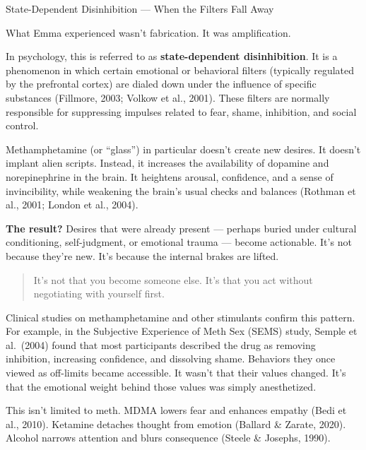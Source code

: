 \begin{TechnicalSidebar}{State-Dependent Disinhibition — When the Filters Fall Away}

  What Emma experienced wasn’t fabrication. It was amplification.

  \medskip
  
  In psychology, this is referred to as \textbf{state-dependent disinhibition}. It is a phenomenon 
  in which certain emotional or behavioral filters (typically regulated by the prefrontal cortex) 
  are dialed down under the influence of specific substances (Fillmore, 2003; Volkow et al., 2001). 
  These filters are normally responsible for suppressing impulses related to fear, shame, inhibition, 
  and social control.

  \medskip
  
  Methamphetamine (or “glass”) in particular doesn’t create new desires. It doesn’t implant alien 
  scripts. Instead, it increases the availability of dopamine and norepinephrine in the brain. It 
  heightens arousal, confidence, and a sense of invincibility, while weakening the brain’s usual 
  checks and balances (Rothman et al., 2001; London et al., 2004).

  \medskip
  
  \textbf{The result?}  
  Desires that were already present --- perhaps buried under cultural conditioning, self-judgment, 
  or emotional trauma --- become actionable. It's not because they’re new. It's because the internal 
  brakes are lifted.

  \begin{quote}
  It’s not that you become someone else.  
  It’s that you act without negotiating with yourself first.
  \end{quote}
  
  Clinical studies on methamphetamine and other stimulants confirm this pattern. For example, in 
  the Subjective Experience of Meth Sex (SEMS) study, Semple et al.\ (2004) found that most participants 
  described the drug as removing inhibition, increasing confidence, and dissolving shame. Behaviors they 
  once viewed as off-limits became accessible. It wasn’t that their values changed. It's that the emotional 
  weight behind those values was simply anesthetized.

  \medskip

  This isn’t limited to meth.  
  MDMA lowers fear and enhances empathy (Bedi et al., 2010).  
  Ketamine detaches thought from emotion (Ballard \& Zarate, 2020).  
  Alcohol narrows attention and blurs consequence (Steele \& Josephs, 1990).


\end{TechnicalSidebar}
